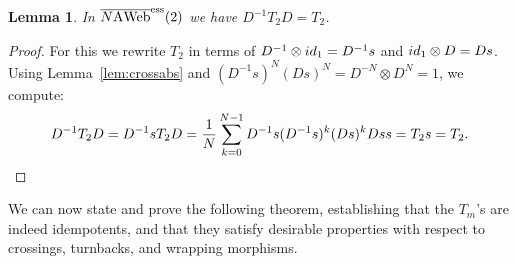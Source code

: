 \documentclass[11pt]{article}
\newtheorem{lemma}[theo]{Lemma}
\theoremstyle{definition}
\numberwithin{equation}{section}
\newcommand{\id}{{\rm id}}
\newcommand{\cat}[1]{\ensuremath{\mbox{\bfseries {\upshape {#1}}}}}
\newcommand{\wrap}{D}
\newcommand{\wrapi}{D^{-1}}
\newcommand{\AWeb}[1][]{#1\cat{A}\cat{Web}}
\newcommand{\essbAWeb}[1][]{\overline{#1\AWeb}^{\mathrm{ess}}}
\begin{document}
\begin{lemma} In $\essbAWeb[N](2)$ we have $\wrapi T_2 \wrap=T_2$.
\end{lemma}
\begin{proof} 
For this we rewrite $T_2$ in terms of $\wrapi\otimes \id_1= \wrapi s$ and $\id_1 \otimes \wrap= \wrap s$. Using Lemma~\ref{lem:crossabs} and $(\wrapi s)^N (\wrap s)^N = \wrap^{-N}\otimes \wrap^N= 1$, we compute:
\[\wrapi T_2 \wrap= \wrapi s T_2 \wrap= \frac{1}{N}\sum_{k=0}^{N-1} \wrapi s ( \wrapi s)^{k}(\wrap s)^k\wrap s s=T_2 s= T_2. \qedhere\]
\end{proof}

We can now state and prove the following theorem, establishing that the $T_m$'s
are indeed idempotents, and that they satisfy desirable properties with respect
to crossings, turnbacks, and wrapping morphisms.
\end{document}
